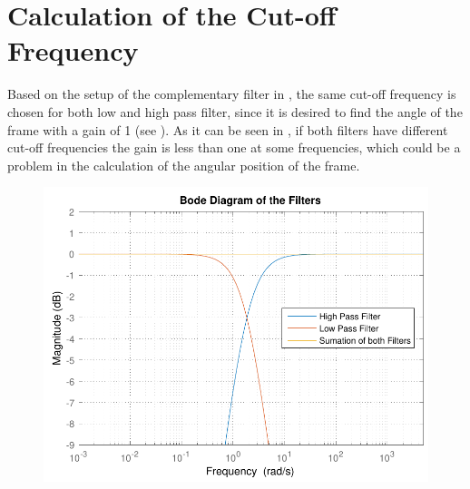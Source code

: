 \section{Calculation of the Cut-off Frequency}
Based on the setup of the complementary filter in , the same cut-off frequency is chosen for both low and high pass filter, since it is desired to find the angle of the frame with a gain of 1 (see ). As it can be seen in , if both filters have different cut-off frequencies the gain is less than one at some frequencies, which could be a problem in the calculation of the angular position of the frame. 

\begin{minipage}{\linewidth}
	\begin{minipage}{0.45\linewidth}
		\begin{figure}[H]
			\includegraphics[scale=.55]{figures/bodeFilters}
			\centering
			\captionsetup{justification=centering}
			\label{bodeFilters}
		\end{figure}
	\end{minipage}
	\hspace{0.03\linewidth}
	\begin{minipage}{0.45\linewidth}
		\begin{figure}[H]\vspace{0mm}

\end{figure}
\end{minipage}
\end{minipage}
